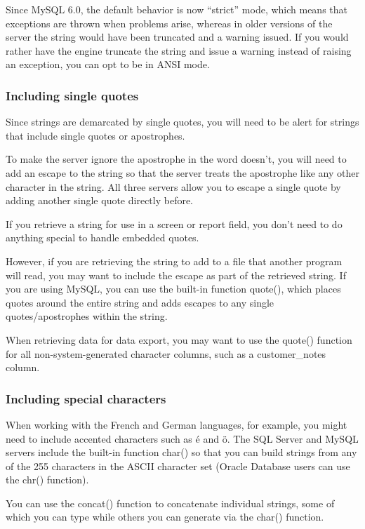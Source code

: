 Since MySQL 6.0, the default behavior is now ``strict'' mode, which means that exceptions are thrown when problems arise, whereas in older versions of the server the string would have been truncated and a warning issued. If you would rather have the engine truncate the string and issue a warning instead of raising an exception, you can opt to be in ANSI mode.

\subsubsection*{Including single quotes}
Since strings are demarcated by single quotes, you will need to be alert for strings that include single quotes or apostrophes.

To make the server ignore the apostrophe in the word doesn't, you will need to add an escape to the string so that the server treats the apostrophe like any other character in the string. All three servers allow you to escape a single quote by adding another single quote directly before.

If you retrieve a string for use in a screen or report field, you don't need to do anything special to handle embedded quotes.

However, if you are retrieving the string to add to a file that another program will read, you may want to include the escape as part of the retrieved string. If you are using MySQL, you can use the built-in function quote(), which places quotes around the entire string and adds escapes to any single quotes/apostrophes within the string.

When retrieving data for data export, you may want to use the quote() function for
all non-system-generated character columns, such as a customer\_notes column.

\subsubsection*{Including special characters}
When working with the French and German languages, for example, you might need to include accented characters such as é and ö. The SQL Server and MySQL servers include the built-in function char() so that you can build strings from any of the 255 characters in the ASCII character set (Oracle Database users can use the chr() function).

You can use the concat() function to concatenate individual strings, some of which you can type while others you can generate via the char() function.

